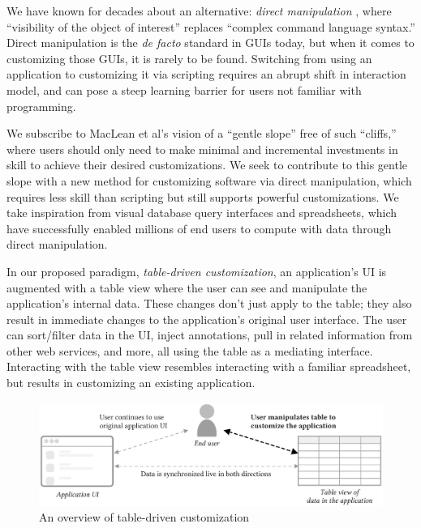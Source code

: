 \documentclass[sigplan,screen,10pt,anonymous,review]{acmart}
\begin{document}
We have known for decades about an alternative: \emph{direct
manipulation} \citep{shneiderman1983}, where ``visibility of the object
of interest'' replaces ``complex command language syntax.'' Direct
manipulation is the \emph{de facto} standard in GUIs today, but when it
comes to customizing those GUIs, it is rarely to be found. Switching
from using an application to customizing it via scripting requires an
abrupt shift in interaction model, and can pose a steep learning barrier
for users not familiar with programming.

We subscribe to MacLean et al's vision of a ``gentle slope''
\citep{maclean1990} free of such ``cliffs,'' where users should only
need to make minimal and incremental investments in skill to achieve
their desired customizations. We seek to contribute to this gentle slope
with a new method for customizing software via direct manipulation,
which requires less skill than scripting but still supports powerful
customizations. We take inspiration from visual database query
interfaces and spreadsheets, which have successfully enabled millions of
end users to compute with data through direct manipulation.

In our proposed paradigm, \emph{table-driven customization}, an
application's UI is augmented with a table view where the user can see
and manipulate the application's internal data. These changes don't just
apply to the table; they also result in immediate changes to the
application's original user interface. The user can sort/filter data in
the UI, inject annotations, pull in related information from other web
services, and more, all using the table as a mediating interface.
Interacting with the table view resembles interacting with a familiar
spreadsheet, but results in customizing an existing application.

\begin{figure}
\hypertarget{fig:overview}{%
\centering
\includegraphics[width=\textwidth]{media/overview.eps}
\caption{An overview of table-driven customization}\label{fig:overview}
}
\end{figure}
\end{document}
